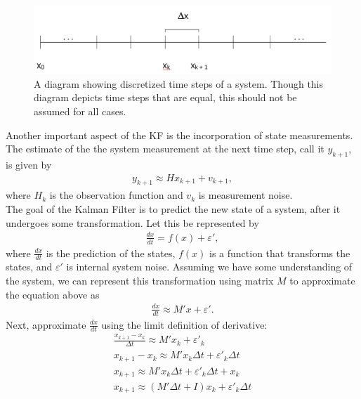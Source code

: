 \begin{figure}[h]
    \centering
    \includegraphics[scale = 0.3]{kgraph.png}
    \caption{A diagram showing discretized time steps of a system. Though this diagram depicts time steps that are equal, this should not be assumed for all cases.}
\end{figure}

\noindent Another important aspect of the KF is the incorporation of state measurements. The estimate of the the system measurement at the next time step, call it $y_{k+1}$, is given by 
\begin{align*}
	y_{k+1} \approx H x_{k+1} + v_{k+1},
\end{align*}
where $H_k$ is the observation function and $v_k$ is measurement noise. \\

\noindent The goal of the Kalman Filter is to predict the new state of a system, after it undergoes some transformation. Let this be represented by 
\begin{align*}
	\frac{dx}{dt} = f(x) + \varepsilon ',
\end{align*}
where $\frac{dx}{dt}$ is the prediction of the states, $f(x)$ is a function that transforms the states, and $ \varepsilon '$ is internal system noise. Assuming we have some understanding of the system, we can represent this transformation using matrix $M$ to approximate the equation above as
\begin{align*}
	\frac{dx}{dt} \approx M'x + \varepsilon '.
\end{align*}
Next, approximate $\frac{dx}{dt}$ using the limit definition of derivative:
\begin{align*}
	\frac{x_{k+1} - x_k}{\Delta t} \approx M'x_k + \varepsilon '_k \\
	x_{k+1} - x_k \approx M'x_k \Delta t + \varepsilon '_k  \Delta t \\
	x_{k+1} \approx M'x_k \Delta t + \varepsilon '_k  \Delta t + x_k \\
	x_{k+1} \approx (M' \Delta t + I)x_k + \varepsilon '_k  \Delta t
\end{align*}

